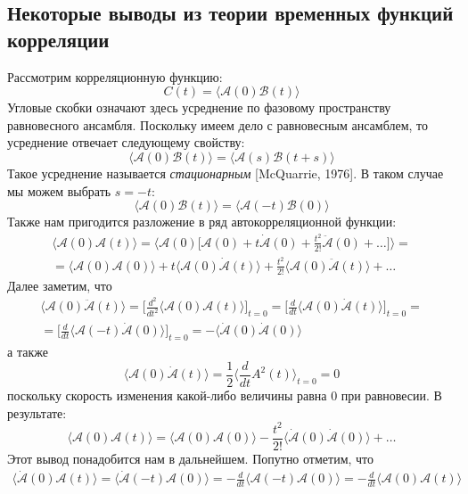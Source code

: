 \subsection{Некоторые выводы из теории временных функций корреляции}
Рассмотрим корреляционную функцию:
\[
C(t) = \langle \mathcal{A}(0) \mathcal{B}(t)\rangle
\]
Угловые скобки означают здесь усреднение по фазовому пространству равновесного ансамбля. Поскольку имеем дело с равновесным ансамблем, то усреднение отвечает следующему свойству:
\[
\langle \mathcal{A}(0) \mathcal{B}(t)\rangle = \langle \mathcal{A}(s) \mathcal{B}(t+s)\rangle
\]
Такое усреднение называется \textit{стационарным} [McQuarrie, 1976]. В таком случае мы можем выбрать $s=-t$:
\[
\langle \mathcal{A}(0) \mathcal{B}(t)\rangle = \langle \mathcal{A}(-t) \mathcal{B}(0)\rangle
\]
Также нам пригодится разложение в ряд автокорреляционной функции:
\[
\begin{aligned}
\langle \mathcal{A}(0) \mathcal{A}(t)\rangle = \big\langle \mathcal{A}(0) \big[ \mathcal{A}(0)+t\dot{\mathcal{A}}(0) + \frac{t^2}{2!}\ddot{\mathcal{A}}(0) + \ldots\big]\big\rangle =\\
=\langle \mathcal{A}(0) \mathcal{A}(0)\rangle + t \langle \mathcal{A}(0) \dot{\mathcal{A}}(t)\rangle +\frac{t^2}{2!}\langle \mathcal{A}(0) \ddot{\mathcal{A}}(t)\rangle + \ldots
\end{aligned}
\]
Далее заметим, что
\[
\begin{aligned}
\langle \mathcal{A}(0) \ddot{\mathcal{A}}(t)\rangle  = \Big[\frac{d^2}{dt^2} \langle \mathcal{A}(0) \mathcal{A}(t)\rangle  \Big]_{t=0} = \Big[\frac{d}{dt} \langle \mathcal{A}(0) \dot{\mathcal{A}}(t)\rangle  \Big]_{t=0} = \\
= \Big[\frac{d}{dt} \langle \mathcal{A}(-t) \dot{\mathcal{A}}(0)\rangle  \Big]_{t=0} = -\langle \dot{\mathcal{A}}(0) \dot{\mathcal{A}}(0)\rangle
\end{aligned}
\]
а также
\[
\langle \mathcal{A}(0) \dot{\mathcal{A}}(t)\rangle = \frac{1}{2}\Big\langle\frac{d}{dt}A^2(t)\Big\rangle_{t=0} = 0
\]
поскольку скорость изменения какой-либо величины равна 0 при равновесии. В результате:
\[
\langle \mathcal{A}(0) \mathcal{A}(t)\rangle = \langle \mathcal{A}(0) \mathcal{A}(0)\rangle - \frac{t^2}{2!}\langle \dot{\mathcal{A}}(0) \dot{\mathcal{A}}(0)\rangle + \ldots
\]
Этот вывод понадобится нам в дальнейшем. Попутно отметим, что
\[
\begin{aligned}
\langle \dot{\mathcal{A}}(0) \mathcal{A}(t) \rangle = \langle \dot{\mathcal{A}}(-t) \mathcal{A}(0) \rangle 
= -\frac{d}{dt} \langle \mathcal{A}(-t) \mathcal{A}(0)\rangle = -\frac{d}{dt}\langle \mathcal{A}(0) \mathcal{A}(t)\rangle
\end{aligned}
\]





